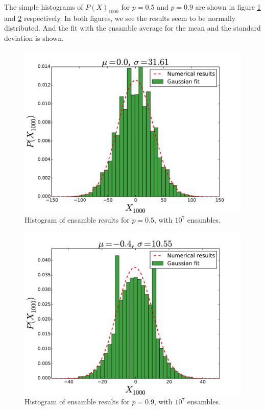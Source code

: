 \documentclass[a4paper, 11pt, notitlepage, english]{article}
\begin{document}
The simple histograms of $P(X)_{1000}$ for $p=0.5$ and $p=0.9$ are shown in figure \ref{fig:hist05} and \ref{fig:hist09} respectively. In both figures, we see the results seem to be normally distributed. And the fit with the ensamble average for the mean and the standard deviation is shown.

\begin{minipage}{\linewidth}
      \centering
      \begin{minipage}{0.45\linewidth}
          \begin{figure}[H]
              \includegraphics[width=\linewidth]{simple_hist3}
              \caption{Histogram of ensamble results for $p=0.5$, with $10^7$ ensambles. \label{fig:hist05}}
          \end{figure}
      \end{minipage}
      \hspace{0.05\linewidth}
      \begin{minipage}{0.45\linewidth}
          \begin{figure}[H]
              \includegraphics[width=\linewidth]{simple_hist4}
              \caption{Histogram of ensamble results for $p=0.9$, with $10^7$ ensambles. \label{fig:hist09}}
          \end{figure}
      \end{minipage}
  \end{minipage}
\end{document}
